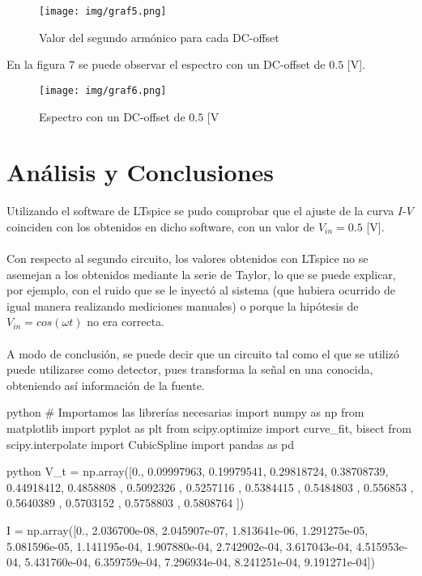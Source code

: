 \begin{figure}[H]
\centering
\texttt{[image: img/graf5.png]}
\caption{\label{fig:Grafico} Valor del segundo armónico para cada DC-offset}
\end{figure}

En la figura 7 se puede observar el espectro con un DC-offset de $0.5$ [V].
\begin{figure}[H]
\centering
\texttt{[image: img/graf6.png]}
\caption{\label{fig:Grafico} Espectro con un DC-offset de $0.5$ [V}
\end{figure}

\newpage
\section{Análisis y Conclusiones}
Utilizando el software de LTspice se pudo comprobar que el ajuste de la curva $I$-$V$ coinciden con los obtenidos en dicho software, con un valor de $V_{in}=0.5$ [V].\\
\\
\indent Con respecto al segundo circuito, los valores obtenidos con LTspice no se asemejan a los obtenidos mediante la serie de Taylor, lo que se puede explicar, por ejemplo, con el ruido que se le inyectó al sistema (que hubiera ocurrido de igual manera realizando mediciones manuales) o porque la hipótesis de $V_{in}=cos(\omega t)$ no era correcta.\\
\\
\indent A modo de conclusión, se puede decir que un circuito tal como el que se utilizó puede utilizarse como detector, pues transforma la señal en una conocida, obteniendo así información de la fuente.
\newpage

\begin{sourcecode}[\label{codigo-python}]{python}
# Importamos las librerías necesarias
import numpy as np
from matplotlib import pyplot as plt
from scipy.optimize import curve_fit, bisect
from scipy.interpolate import CubicSpline
import pandas as pd
\end{sourcecode}

\begin{sourcecode}[\label{codigo-python}]{python}
V_t = np.array([0., 0.09997963, 0.19979541, 0.29818724, 0.38708739,
       0.44918412, 0.4858808 , 0.5092326 , 0.5257116 , 0.5384415 ,
       0.5484803 , 0.556853  , 0.5640389 , 0.5703152 , 0.5758803 ,
       0.5808764 ])

I = np.array([0., 2.036700e-08, 2.045907e-07, 1.813641e-06,
       1.291275e-05, 5.081596e-05, 1.141195e-04, 1.907880e-04,
       2.742902e-04, 3.617043e-04, 4.515953e-04, 5.431760e-04,
       6.359759e-04, 7.296934e-04, 8.241251e-04, 9.191271e-04])
\end{sourcecode}

